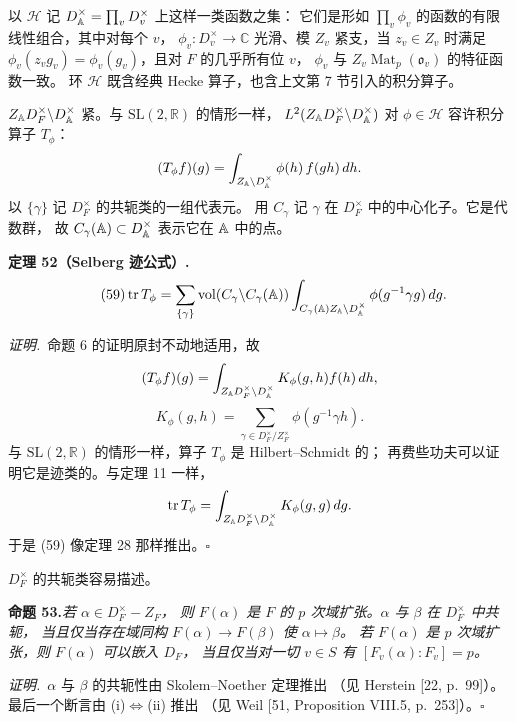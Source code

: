 以 $\mathcal{H}$ 记 $D_{\mathbb{A}}^{\times}=\prod_{v}D_{v}^{\times}$ 上这样一类函数之集：
它们是形如 $\prod_{v}\phi_{v}$ 的函数的有限线性组合，其中对每个 $v$，
$\phi_{v}:D_{v}^{\times}\to\mathbb{C}$ 光滑、模 $Z_{v}$ 紧支，当 $z_{v}\in Z_{v}$ 时满足
$\phi_{v}(z_{v}g_{v})=\phi_{v}(g_{v})$，且对 $F$ 的几乎所有位 $v$，
$\phi_{v}$ 与 $Z_{v}\operatorname{Mat}_{p}(\mathfrak{o}_{v})$ 的特征函数一致。
环 $\mathcal{H}$ 既含经典 Hecke 算子，也含上文第 7 节引入的积分算子。

$Z_{\mathbb{A}}D_{F}^{\times}\backslash D_{\mathbb{A}}^{\times}$ 紧。与 $\mathrm{SL}(2,\mathbb{R})$ 的情形一样，
$L^{2}(Z_{\mathbb{A}}D_{F}^{\times}\backslash D_{\mathbb{A}}^{\times})$ 对 $\phi\in\mathcal{H}$ 容许积分算子
$T_{\phi}$：
\[
(T_{\phi}f)(g)=\int_{Z_{\mathbb{A}}\backslash D_{\mathbb{A}}^{\times}}\phi(h)\,f(gh)\,dh .
\]
以 $\{\gamma\}$ 记 $D_{F}^{\times}$ 的共轭类的一组代表元。
用 $C_{\gamma}$ 记 $\gamma$ 在 $D_{F}^{\times}$ 中的中心化子。它是代数群，
故 $C_{\gamma}(\mathbb{A})\subset D_{\mathbb{A}}^{\times}$ 表示它在 $\mathbb{A}$ 中的点。

\par\medskip\noindent\textbf{定理 52（Selberg 迹公式）.}\quad
\begin{equation}\tag{59}
\operatorname{tr}T_{\phi}=\sum_{\{\gamma\}}
\operatorname{vol}(C_{\gamma}\backslash C_{\gamma}(\mathbb{A}))
\int_{C_{\gamma}(\mathbb{A})Z_{\mathbb{A}}\backslash D_{\mathbb{A}}^{\times}}\phi(g^{-1}\gamma g)\,dg .
\end{equation}

\smallskip
\noindent\emph{证明.}\ 命题 6 的证明原封不动地适用，故
\[
(T_{\phi}f)(g)=\int_{Z_{\mathbb{A}}D_{F}^{\times}\backslash D_{\mathbb{A}}^{\times}}K_{\phi}(g,h)f(h)\,dh,
\]
\[
K_{\phi}(g,h)=\sum_{\gamma\in D_{F}^{\times}/Z_{F}^{\times}}\phi(g^{-1}\gamma h).
\]
与 $\mathrm{SL}(2,\mathbb{R})$ 的情形一样，算子 $T_{\phi}$ 是 Hilbert--Schmidt 的；
再费些功夫可以证明它是迹类的。与定理 11 一样，
\[
\operatorname{tr}T_{\phi}=\int_{Z_{\mathbb{A}}D_{F}^{\times}\backslash D_{\mathbb{A}}^{\times}}
K_{\phi}(g,g)\,dg .
\]
于是 (59) 像定理 28 那样推出。\hfill$\square$

$D_{F}^{\times}$ 的共轭类容易描述。

\par\medskip\noindent\textbf{命题 53.}\quad\emph{若 $\alpha\in D_{F}^{\times}-Z_{F}$，
则 $F(\alpha)$ 是 $F$ 的 $p$ 次域扩张。$\alpha$ 与 $\beta$ 在 $D_{F}^{\times}$ 中共轭，
当且仅当存在域同构 $F(\alpha)\to F(\beta)$ 使 $\alpha\mapsto\beta$。
若 $F(\alpha)$ 是 $p$ 次域扩张，则 $F(\alpha)$ 可以嵌入 $D_{F}$，
当且仅当对一切 $v\in S$ 有 $[F_{v}(\alpha):F_{v}]=p$。}

\smallskip
\noindent\emph{证明.}\ $\alpha$ 与 $\beta$ 的共轭性由 Skolem--Noether 定理推出
（见 Herstein [22, p.\ 99]）。最后一个断言由 (i)$\Leftrightarrow$(ii) 推出
（见 Weil [51, Proposition VIII.5, p.\ 253]）。\hfill$\square$

